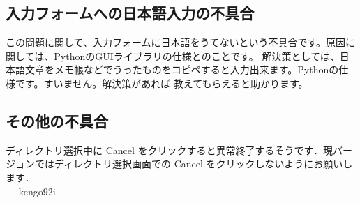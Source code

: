 \documentclass[]{jsarticle}
\begin{document}
\subsection{入力フォームへの日本語入力の不具合}

この問題に関して、入力フォームに日本語をうてないという不具合です。原因に関しては、PythonのGUIライブラリの仕様とのことです。
解決策としては、日本語文章をメモ帳などでうったものをコピペすると入力出来ます。Pythonの仕様です。すいません。解決策があれば
教えてもらえると助かります。\\

\subsection{その他の不具合}
ディレクトリ選択中に Cancel をクリックすると異常終了するそうです．現バージョンではディレクトリ選択画面での Cancel をクリックしないようにお願いします．\\

--- kengo92i
\end{document}
